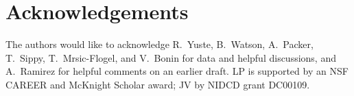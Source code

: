 \documentclass[aoas,preprint]{imsart}
\begin{document}
\section*{Acknowledgements}
The authors would like to acknowledge R.\ Yuste, B.\ Watson, A.\
Packer, T.\ Sippy, T.\ Mrsic-Flogel, and V.\ Bonin for data and
helpful discussions, and A.\ Ramirez for helpful comments on an
earlier draft.  LP is supported by an NSF CAREER and McKnight Scholar
award; JV by NIDCD grant DC00109.


% 

\end{document}

